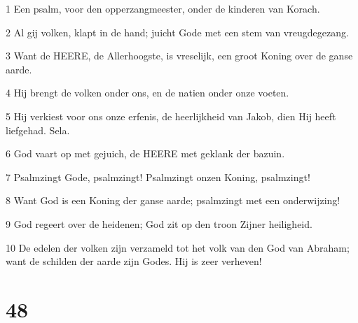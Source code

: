 \par 1 Een psalm, voor den opperzangmeester, onder de kinderen van Korach.
\par 2 Al gij volken, klapt in de hand; juicht Gode met een stem van vreugdegezang.
\par 3 Want de HEERE, de Allerhoogste, is vreselijk, een groot Koning over de ganse aarde.
\par 4 Hij brengt de volken onder ons, en de natien onder onze voeten.
\par 5 Hij verkiest voor ons onze erfenis, de heerlijkheid van Jakob, dien Hij heeft liefgehad. Sela.
\par 6 God vaart op met gejuich, de HEERE met geklank der bazuin.
\par 7 Psalmzingt Gode, psalmzingt! Psalmzingt onzen Koning, psalmzingt!
\par 8 Want God is een Koning der ganse aarde; psalmzingt met een onderwijzing!
\par 9 God regeert over de heidenen; God zit op den troon Zijner heiligheid.
\par 10 De edelen der volken zijn verzameld tot het volk van den God van Abraham; want de schilden der aarde zijn Godes. Hij is zeer verheven!

\chapter{48}

